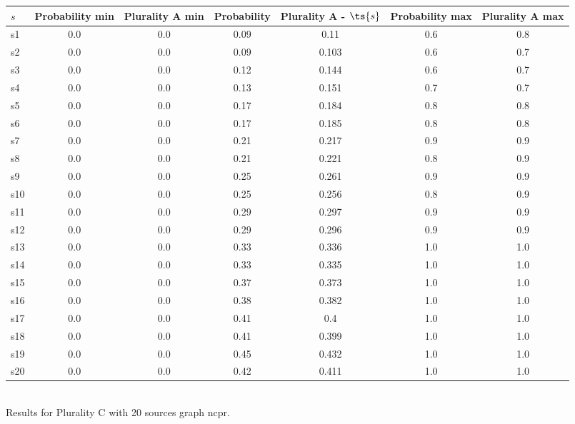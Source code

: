 \documentclass{article}
\begin{document}
\noindent\begin{tabular}{|l|c|c|c|c|c|c|}
\hline
$s$& Probability min & Plurality A min & Probability & Plurality A - $\ts{s}$ & Probability max & Plurality A max\\
\hline
s1 &0.0 & 0.0 & 0.09 & 0.11 & 0.6 & 0.8\\
\hline
s2 &0.0 & 0.0 & 0.09 & 0.103 & 0.6 & 0.7\\
\hline
s3 &0.0 & 0.0 & 0.12 & 0.144 & 0.6 & 0.7\\
\hline
s4 &0.0 & 0.0 & 0.13 & 0.151 & 0.7 & 0.7\\
\hline
s5 &0.0 & 0.0 & 0.17 & 0.184 & 0.8 & 0.8\\
\hline
s6 &0.0 & 0.0 & 0.17 & 0.185 & 0.8 & 0.8\\
\hline
s7 &0.0 & 0.0 & 0.21 & 0.217 & 0.9 & 0.9\\
\hline
s8 &0.0 & 0.0 & 0.21 & 0.221 & 0.8 & 0.9\\
\hline
s9 &0.0 & 0.0 & 0.25 & 0.261 & 0.9 & 0.9\\
\hline
s10 &0.0 & 0.0 & 0.25 & 0.256 & 0.8 & 0.9\\
\hline
s11 &0.0 & 0.0 & 0.29 & 0.297 & 0.9 & 0.9\\
\hline
s12 &0.0 & 0.0 & 0.29 & 0.296 & 0.9 & 0.9\\
\hline
s13 &0.0 & 0.0 & 0.33 & 0.336 & 1.0 & 1.0\\
\hline
s14 &0.0 & 0.0 & 0.33 & 0.335 & 1.0 & 1.0\\
\hline
s15 &0.0 & 0.0 & 0.37 & 0.373 & 1.0 & 1.0\\
\hline
s16 &0.0 & 0.0 & 0.38 & 0.382 & 1.0 & 1.0\\
\hline
s17 &0.0 & 0.0 & 0.41 & 0.4 & 1.0 & 1.0\\
\hline
s18 &0.0 & 0.0 & 0.41 & 0.399 & 1.0 & 1.0\\
\hline
s19 &0.0 & 0.0 & 0.45 & 0.432 & 1.0 & 1.0\\
\hline
s20 &0.0 & 0.0 & 0.42 & 0.411 & 1.0 & 1.0\\
\hline
\end{tabular}\\

\noindent Results for Plurality C with 20 sources graph ncpr.
\end{document}
